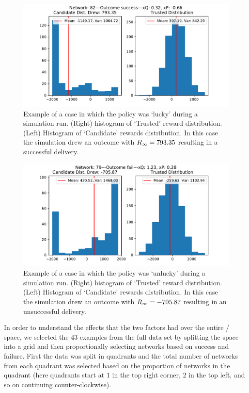 \begin{figure}[tbp]
    \centering
    \includegraphics[width=1.0\linewidth]{Figures/mturk_5_Ntprob_solver_82_surprisesuccess.pdf}
    \vfill
    \caption{Example of a case in which the policy was `lucky' during a simulation run. (Right) histogram of `Trusted' reward distribution. (Left) Histogram of `Candidate' rewards distribution. In this case the simulation drew an outcome with $R_{\infty} = 793.35$ resulting in a successful delivery.}
    \label{fig:appendix_lucky}
\end{figure}

\begin{figure}[tbp]
    \centering
    \includegraphics[width=1.0\linewidth]{Figures/mturk_5_Ntprob_solver_79_surprisefail.pdf}
    \vfill
    \caption{Example of a case in which the policy was `unlucky' during a simulation run. (Right) histogram of `Trusted' reward distribution. (Left) Histogram of `Candidate' rewards distribution. In this case the simulation drew an outcome with $R_{\infty} = -705.87$ resulting in an unsuccessful delivery.}
    \label{fig:appendix_unlucky}
\end{figure}

In order to understand the effects that the two \famsec{} factors had over the entire \xQ{}/\xO{} space, we selected the 43 examples from the full data set by splitting the space into a grid and then proportionally selecting networks based on success and failure. First the data was split in quadrants and the total number of networks from each quadrant was selected based on the proportion of networks in the quadrant (here quadrants start at $1$ in the top right corner, $2$ in the top left, and so on continuing counter-clockwise).

